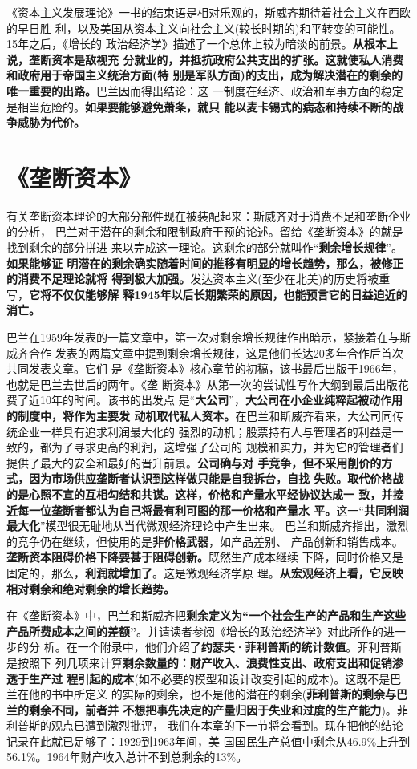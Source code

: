 《资本主义发展理论》一书的结束语是相对乐观的，斯威齐期待着社会主义在西欧的早日胜
利，以及美国从资本主义向社会主义(较长时期的)和平转变的可能性。15年之后，《增长的
政治经济学》描述了一个总体上较为暗淡的前景。\textbf{从根本上说，垄断资本是敌视充
  分就业的，并抵抗政府公共支出的扩张。这就使私人消费和政府用于帝国主义统治方面(特
  别是军队方面)的支出，成为解决潜在的剩余的唯一重要的出路。}巴兰因而得出结论：这
一制度在经济、政治和军事方面的稳定是相当危险的。\textbf{如果要能够避免萧条，就只
  能以麦卡锡式的病态和持续不断的战争威胁为代价。}

\section{《垄断资本》}
有关垄断资本理论的大部分部件现在被装配起来：斯威齐对于消费不足和垄断企业的分析，
巴兰对于潜在的剩余和限制政府干预的论述。留给《垄断资本》的就是找到剩余的部分拼进
来以完成这一理论。这剩余的部分就叫作“\textbf{剩余增长规律}”。\textbf{如果能够证
  明潜在的剩余确实随着时间的推移有明显的增长趋势，那么，被修正的消费不足理论就将
  得到极大加强。}发达资本主义(至少在北美)的历史将被重写，\textbf{它将不仅仅能够解
  释1945年以后长期繁荣的原因，也能预言它的日益迫近的消亡。}

巴兰在1959年发表的一篇文章中，第一次对剩余增长规律作出暗示，紧接着在与斯威齐合作
发表的两篇文章中提到剩余增长规律，这是他们长达20多年合作后首次共同发表文章。它们
是《垄断资本》核心章节的初稿，该书最后出版于1966年，也就是巴兰去世后的两年。《垄
断资本》从第一次的尝试性写作大纲到最后出版花费了近10年的时间。该书的出发点
是“\textbf{大公司}”，\textbf{大公司在小企业纯粹起被动作用的制度中，将作为主要发
  动机取代私人资本。}在巴兰和斯威齐看来，大公司同传统企业一样具有追求利润最大化的
强烈的动机；股票持有人与管理者的利益是一致的，都为了寻求更高的利润，这增强了公司的
规模和实力，并为它的管理者们提供了最大的安全和最好的晋升前景。\textbf{公司确与对
  手竞争，但不采用削价的方式，因为市场供应垄断者认识到这样做只能是自我拆台，自找
  失败。取代价格战的是心照不宣的互相勾结和共谋。这样，价格和产量水平经协议达成一
  致，并接近每一位垄断者都认为自己将最有利可图的那一价格和产量水
  平。}这一“\textbf{共同利润最大化}”模型很无耻地从当代微观经济理论中产生出来。
巴兰和斯威齐指出，激烈的竞争仍在继续，但使用的是\textbf{非价格武器}，如产品差别、
产品创新和销售成本。\textbf{垄断资本阻碍价格下降要甚于阻碍创新。}既然生产成本继续
下降，同时价格又是固定的，那么，\textbf{利润就增加了}。这是微观经济学原
理。\textbf{从宏观经济上看，它反映相对剩余和绝对剩余的增长趋势。}

在《垄断资本》中，巴兰和斯威齐把\textbf{剩余定义为“一个社会生产的产品和生产这些
  产品所费成本之间的差额”}。并请读者参阅《增长的政治经济学》对此所作的进一步的分
析。在一个附录中，他们介绍了\textbf{约瑟夫·菲利普斯的统计数值}。菲利普斯是按照下
列几项来计算\textbf{剩余数量的：财产收入、浪费性支出、政府支出和促销渗透于生产过
  程引起的成本}(如不必要的模型和设计改变引起的成本)。这既不是巴兰在他的书中所定义
的实际的剩余，也不是他的潜在的剩余(\textbf{菲利普斯的剩余与巴兰的剩余不同，前者并
  不想把事先决定的产量归因于失业和过度的生产能力})。菲利普斯的观点已遭到激烈批评，
我们在本章的下一节将会看到。现在把他的结论记录在此就已足够了：1929到1963年间，美
国国民生产总值中剩余从46.9\%上升到56.1\%。1964年财产收入总计不到总剩余的13\%。

